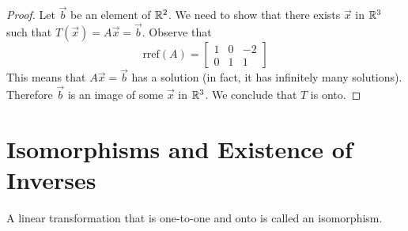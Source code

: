 \documentclass{ximera}
\begin{document}
\begin{example}
\begin{proof}

Let $\vec{b}$ be an element of $\mathbb{R}^2$.  We need to show that there exists $\vec{x}$ in $\mathbb{R}^3$ such that $T(\vec{x})=A\vec{x}=\vec{b}$. 
Observe that
 $$\mbox{rref}(A)=\begin{bmatrix}1 & 0 & -2\\0 & 1 & 1\end{bmatrix}$$
 This means that $A\vec{x}=\vec{b}$ has a solution (in fact, it has infinitely many solutions).  Therefore $\vec{b}$ is an image of some $\vec{x}$ in $\mathbb{R}^3$. We conclude that $T$ is onto. 
 
 


\end{proof}
\end{example}

\section*{Isomorphisms and Existence of Inverses}

\begin{definition} A linear transformation that is one-to-one and onto is called an isomorphism.
\end{definition}
\end{document}
